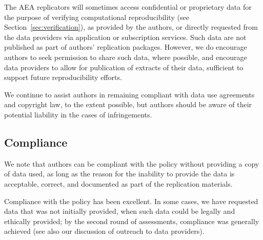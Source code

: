 \documentclass[PP]{AEA}
\begin{document}
The AEA replicators will sometimes access confidential or proprietary data for the purpose of verifying computational reproducibility (see Section~\ref{sec:verification}), as provided by the authors, or directly requested from the data providers via application or subscription services. Such data are not published as part of authors' replication packages. However, we do encourage authors to seek permission to share such data, where possible, and encourage data providers to allow for publication of extracts of their data, sufficient to support future reproducibility efforts.


We continue to assist authors in remaining compliant with data use agreements and copyright law, to the extent possible, but authors should be aware of their potential liability in the cases of infringements. 


\subsection{Compliance}
\label{sec:compliance}

%
%    
%


We note that authors can be compliant with the policy without providing a copy of data used, as long as the reason for the inability to provide the data is acceptable, correct, and documented as part of the replication materials. 

Compliance with the policy %
has been excellent. In some cases, we have requested data that was not initially provided, when such data could be legally and ethically provided; by the second round of assessments, compliance was generally achieved (see also our discussion of outreach to data providers).
\end{document}
